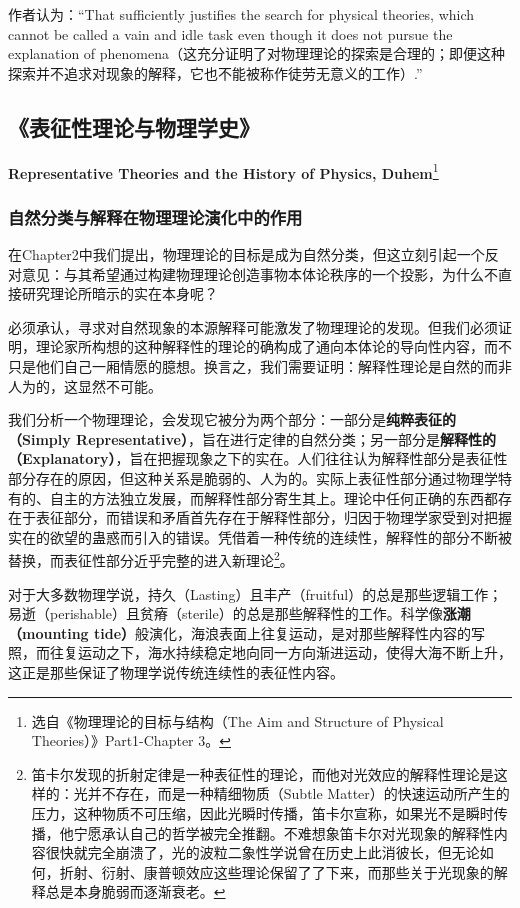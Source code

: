 \documentclass[12pt, a4paper, oneside]{ctexart}
\renewcommand{\b}{\textbf}
\newcommand{\f}{\footnote}
\begin{document}
作者认为：“That sufficiently justifies the search for physical theories, which cannot be called a vain and idle task even though it does not pursue the explanation of phenomena（这充分证明了对物理理论的探索是合理的；即便这种探索并不追求对现象的解释，它也不能被称作徒劳无意义的工作）.”

\subsection{《表征性理论与物理学史》}
\textbf{Representative Theories and the History of Physics, Duhem}\f{选自《物理理论的目标与结构（The Aim and Structure of Physical Theories）》Part1-Chapter 3。}
\subsubsection{自然分类与解释在物理理论演化中的作用}
在Chapter2中我们提出，物理理论的目标是成为自然分类，但这立刻引起一个反对意见：与其希望通过构建物理理论创造事物本体论秩序的一个投影，为什么不直接研究理论所暗示的实在本身呢？

必须承认，寻求对自然现象的本源解释可能激发了物理理论的发现。但我们必须证明，理论家所构想的这种解释性的理论的确构成了通向本体论的导向性内容，而不只是他们自己一厢情愿的臆想。换言之，我们需要证明：解释性理论是自然的而非人为的，这显然不可能。

我们分析一个物理理论，会发现它被分为两个部分：一部分是\b{纯粹表征的（Simply Representative）}，旨在进行定律的自然分类；另一部分是\b{解释性的（Explanatory）}，旨在把握现象之下的实在。人们往往认为解释性部分是表征性部分存在的原因，但这种关系是脆弱的、人为的。实际上表征性部分通过物理学特有的、自主的方法独立发展，而解释性部分寄生其上。理论中任何正确的东西都存在于表征部分，而错误和矛盾首先存在于解释性部分，归因于物理学家受到对把握实在的欲望的蛊惑而引入的错误。凭借着一种传统的连续性，解释性的部分不断被替换，而表征性部分近乎完整的进入新理论\f{笛卡尔发现的折射定律是一种表征性的理论，而他对光效应的解释性理论是这样的：光并不存在，而是一种精细物质（Subtle Matter）的快速运动所产生的压力，这种物质不可压缩，因此光瞬时传播，笛卡尔宣称，如果光不是瞬时传播，他宁愿承认自己的哲学被完全推翻。不难想象笛卡尔对光现象的解释性内容很快就完全崩溃了，光的波粒二象性学说曾在历史上此消彼长，但无论如何，折射、衍射、康普顿效应这些理论保留了了下来，而那些关于光现象的解释总是本身脆弱而逐渐衰老。}。

对于大多数物理学说，持久（Lasting）且丰产（fruitful）的总是那些逻辑工作；易逝（perishable）且贫瘠（sterile）的总是那些解释性的工作。科学像\b{涨潮（mounting tide）}般演化，海浪表面上往复运动，是对那些解释性内容的写照，而往复运动之下，海水持续稳定地向同一方向渐进运动，使得大海不断上升，这正是那些保证了物理学说传统连续性的表征性内容。
\end{document}
